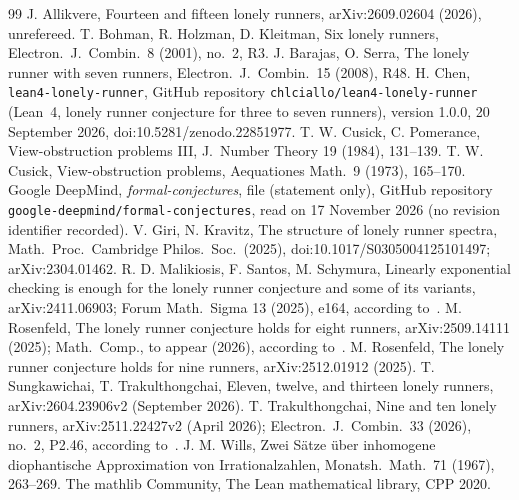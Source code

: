\documentclass[11pt]{article}
\theoremstyle{remark}
\begin{document}
\begin{thebibliography}{99}
 J. Allikvere, Fourteen and fifteen lonely runners, arXiv:2609.02604 (2026), unrefereed.
 T. Bohman, R. Holzman, D. Kleitman, Six lonely runners, Electron.\ J.\ Combin.\ 8 (2001), no.~2, R3.
 J. Barajas, O. Serra, The lonely runner with seven runners, Electron.\ J.\ Combin.\ 15 (2008), R48.
 H. Chen, \texttt{lean4-lonely-runner}, GitHub repository \texttt{chlciallo/lean4-lonely-runner} (Lean~4, lonely runner conjecture for three to seven runners), version 1.0.0, 20 September 2026, doi:10.5281/zenodo.22851977.
 T. W. Cusick, C. Pomerance, View-obstruction problems III, J.\ Number Theory 19 (1984), 131--139.
 T. W. Cusick, View-obstruction problems, Aequationes Math.\ 9 (1973), 165--170.
 Google DeepMind, \emph{formal-conjectures}, file  (statement only), GitHub repository \texttt{google-deepmind/formal-conjectures}, read on 17 November 2026 (no revision identifier recorded).
 V. Giri, N. Kravitz, The structure of lonely runner spectra, Math.\ Proc.\ Cambridge Philos.\ Soc.\ (2025), doi:10.1017/S0305004125101497; arXiv:2304.01462.
 R. D. Malikiosis, F. Santos, M. Schymura, Linearly exponential checking is enough for the lonely runner conjecture and some of its variants, arXiv:2411.06903; Forum Math.\ Sigma 13 (2025), e164, according to~\cite{ST}.
 M. Rosenfeld, The lonely runner conjecture holds for eight runners, arXiv:2509.14111 (2025); Math.\ Comp., to appear (2026), according to~\cite{ST}.
 M. Rosenfeld, The lonely runner conjecture holds for nine runners, arXiv:2512.01912 (2025).
 T. Sungkawichai, T. Trakulthongchai, Eleven, twelve, and thirteen lonely runners, arXiv:2604.23906v2 (September 2026).
 T. Trakulthongchai, Nine and ten lonely runners, arXiv:2511.22427v2 (April 2026); Electron.\ J.\ Combin.\ 33 (2026), no.~2, P2.46, according to~\cite{ST}.
 J. M. Wills, Zwei S\"atze \"uber inhomogene diophantische Approximation von Irrationalzahlen, Monatsh.\ Math.\ 71 (1967), 263--269.
 The mathlib Community, The Lean mathematical library, CPP 2020.
\end{thebibliography}
\end{document}
